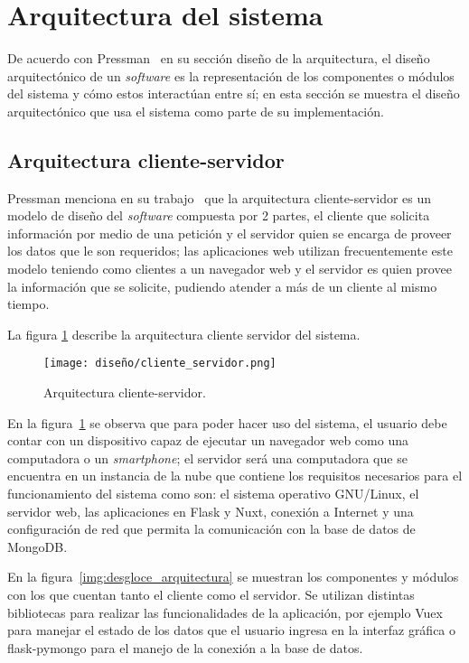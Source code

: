 \section{Arquitectura del sistema}

De acuerdo con Pressman~\cite{pressman_software_2005} en su sección diseño de la arquitectura, el diseño arquitectónico de un \textit{software} es la representación de los componentes o módulos del sistema y cómo estos interactúan entre sí; en esta sección se muestra el diseño arquitectónico que usa el sistema como parte de su implementación.

\subsection{Arquitectura cliente-servidor}

Pressman menciona en su trabajo~\cite{pressman_software_2005} que la arquitectura cliente-servidor es un modelo de diseño del \textit{software} compuesta por 2 partes, el cliente que solicita información por medio de una petición y el servidor quien se encarga de proveer los datos que le son requeridos; las aplicaciones web utilizan frecuentemente este modelo teniendo como clientes a un navegador web y el servidor es quien provee la información que se solicite, pudiendo atender a más de un cliente al mismo tiempo.

La figura \ref{img:arq_client_server} describe la arquitectura cliente servidor del sistema.

\begin{figure}[H]
    \centering
    \texttt{[image: diseño/cliente\_servidor.png]}
    \caption{Arquitectura cliente-servidor.}
    \label{img:arq_client_server}
\end{figure}


En la figura~\ref{img:arq_client_server} se observa que para poder hacer uso del sistema, el usuario debe contar con un dispositivo capaz de ejecutar un navegador web como una computadora o un \textit{smartphone}; el servidor será una computadora que se encuentra en un instancia de la nube que contiene los requisitos necesarios para el funcionamiento del sistema como son: el sistema operativo GNU/Linux, el servidor web, las aplicaciones en Flask y Nuxt, conexión a Internet y una configuración de red que permita la comunicación con la base de datos de MongoDB.

En la figura~\ref{img:desgloce_arquitectura} se muestran los componentes y módulos con los que cuentan tanto el cliente como el servidor. Se utilizan distintas bibliotecas para realizar las funcionalidades de la aplicación, por ejemplo Vuex para manejar el estado de los datos que el usuario ingresa en la interfaz gráfica o flask-pymongo para el manejo de la conexión a la base de datos.

